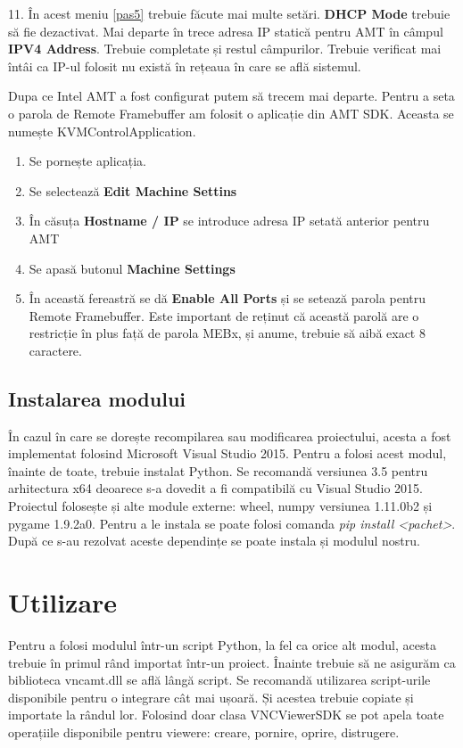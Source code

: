 11. În acest meniu \ref{pas5} trebuie făcute mai multe setări. \textbf{DHCP Mode} trebuie să fie dezactivat. Mai departe în trece adresa IP statică pentru AMT în câmpul \textbf{IPV4 Address}. Trebuie completate și restul câmpurilor. Trebuie verificat mai întâi ca IP-ul folosit nu există în rețeaua în care se află sistemul.


Dupa ce Intel AMT a fost configurat putem să trecem mai departe. Pentru a seta o parola de Remote Framebuffer am folosit o aplicație din AMT SDK. Aceasta se numește KVMControlApplication.

\begin{enumerate}
  \item Se pornește aplicația. 
  \item Se selectează \textbf{Edit Machine Settins}
  \item În căsuța \textbf{Hostname / IP} se introduce adresa IP setată anterior pentru AMT
  \item Se apasă butonul \textbf{Machine Settings}
  \item În această fereastră se dă \textbf{Enable All Ports} și se setează parola pentru Remote Framebuffer. Este important de reținut că această parolă are o restricție în plus față de parola MEBx, și anume, trebuie să aibă exact 8 caractere.
\end{enumerate}

\subsection{Instalarea modului}

În cazul în care se dorește recompilarea sau modificarea proiectului, acesta a fost implementat folosind Microsoft Visual Studio 2015. Pentru a folosi acest modul, înainte de toate, trebuie instalat Python. Se recomandă versiunea 3.5 pentru arhitectura x64 deoarece s-a dovedit a fi compatibilă cu Visual Studio 2015. Proiectul folosește și alte module externe: wheel, numpy versiunea 1.11.0b2 și pygame 1.9.2a0. Pentru a le instala se poate folosi comanda \textit{pip install <pachet>}. După ce s-au rezolvat aceste dependințe se poate instala și modulul nostru.

\section{Utilizare}

Pentru a folosi modulul într-un script Python, la fel ca orice alt modul, acesta trebuie în primul rând importat într-un proiect. Înainte trebuie să ne asigurăm ca biblioteca vncamt.dll se află lângă script. Se recomandă utilizarea script-urile disponibile pentru o integrare cât mai ușoară. Și acestea trebuie copiate și importate la rândul lor. Folosind doar clasa VNCViewerSDK se pot apela toate operațiile disponibile pentru viewere: creare, pornire, oprire, distrugere.

